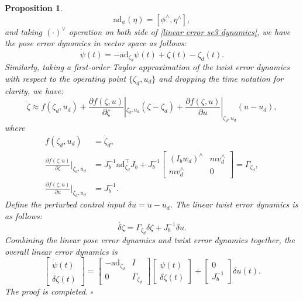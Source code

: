 \documentclass[lettersize,journal]{IEEEtran}
\newtheorem{mypro}{Proposition}
\newcommand{\ad}{\text{ad}}
\begin{document}
\begin{mypro}
\begin{equation*}
    \ad_{\phi}(\eta) = [\phi^{\wedge}, \eta^{\wedge}],
\end{equation*}
and taking $(\cdot)^{\vee}$ operation on both side of \eqref{linear error se3 dynamics}, we have the pose error dynamics in vector space as follows:
\begin{equation} \label{linear perturbed configuration dyna}
        \dot{\psi}(t) =-\ad_{\zeta_d}\psi(t) + \zeta(t) - \zeta_d(t).
\end{equation}
Similarly, taking a first-order Taylor approximation of the twist error dynamics with respect to the operating point $\{\zeta_d, u_d\}$ and dropping the time notation for clarity, we have:
\begin{equation*}
    \dot{\zeta} \approx f(\zeta_d, u_d)+ \frac{\partial f(\zeta, u)}{\partial \zeta}|_{\zeta_d, u_d} (\zeta - \zeta_d)+ \frac{\partial f(\zeta, u)}{\partial u}|_{\zeta_d, u_d}(u - u_d),
\end{equation*}
where
\begin{equation*}
    \begin{aligned}
        f(\zeta_d, u_d) &= \dot{\zeta}_d,\\
        \frac{\partial f(\zeta, u)}{\partial \zeta}|_{\zeta_d, u_d} &= J_b^{-1}\ad_{\zeta_d}^{\top}J_b + J_b^{-1}\begin{bmatrix}
            (I_b w_d)^{\wedge} & m v_d^{\wedge}\\
            m v_d^{\wedge} & 0
        \end{bmatrix}  = \Gamma_{\zeta_d},\\
        \frac{\partial f(\zeta, u)}{\partial u}|_{\zeta_d, u_d} &= J_b^{-1}.
    \end{aligned}
\end{equation*}
 Define the perturbed control input $\delta u = u - u_d$. The linear twist error dynamics is as follows:
\begin{equation} \label{linearized perturbed velocity dynamics}
    \dot{\delta \zeta} = \Gamma_{\zeta_d} \delta\zeta + J_b^{-1} \delta u.
\end{equation}
Combining the linear pose error dynamics and twist error dynamics together, the overall linear error dynamics is
\begin{equation}
    \begin{bmatrix}
    \dot{\psi}(t)\\ \dot{\delta \zeta}(t)
\end{bmatrix} = \begin{bmatrix}
        -\ad_{\zeta_d} & I \\ 0 & \Gamma_{\zeta_d}
    \end{bmatrix}\begin{bmatrix}
    \psi(t)\\ \delta \zeta(t)
\end{bmatrix} + \begin{bmatrix}
    0 \\ J_b^{-1}
\end{bmatrix}\delta u(t).
 \end{equation}
 The proof is completed. \hfill $\square$
\end{mypro}
\end{document}
